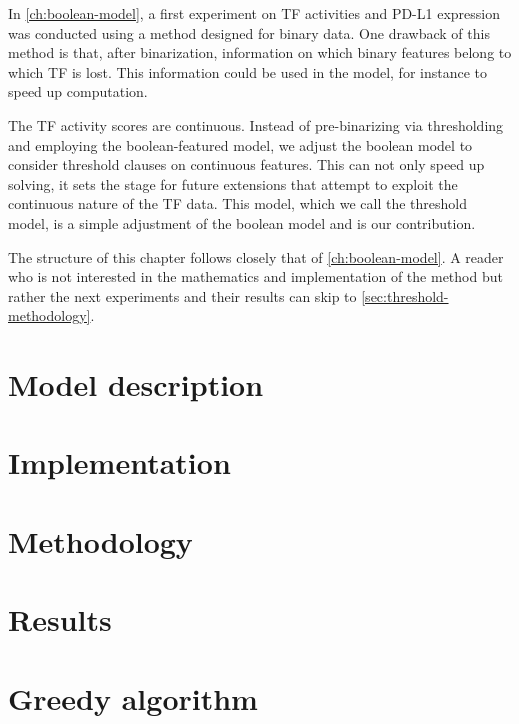In \autoref{ch:boolean-model}, a first experiment on TF activities and PD-L1 expression
was conducted using a method designed for binary data.
One drawback of this method is that, after binarization,
information on which binary features belong to which TF is lost.
This information could be used in the model, for instance to speed up computation.

The TF activity scores are continuous.
Instead of pre-binarizing via thresholding and employing the boolean-featured model,
we adjust the boolean model to consider threshold clauses on continuous features.
This can not only speed up solving,
it sets the stage for future extensions that attempt to exploit the continuous nature of the TF data.
This model, which we call the threshold model, is a simple adjustment of the boolean model and is our contribution.

The structure of this chapter follows closely that of \autoref{ch:boolean-model}.
A reader who is not interested in the mathematics and implementation of the method but rather the next experiments and their results can
skip to \autoref{sec:threshold-methodology}.

\section{Model description}\label{sec:threshold-model-description}


\section{Implementation}\label{sec:threshold-implementation}


\section{Methodology}\label{sec:threshold-methodology}


\section{Results}\label{sec:threshold-results}


\clearpage
\section{Greedy algorithm}\label{sec:threshold_greedy}
